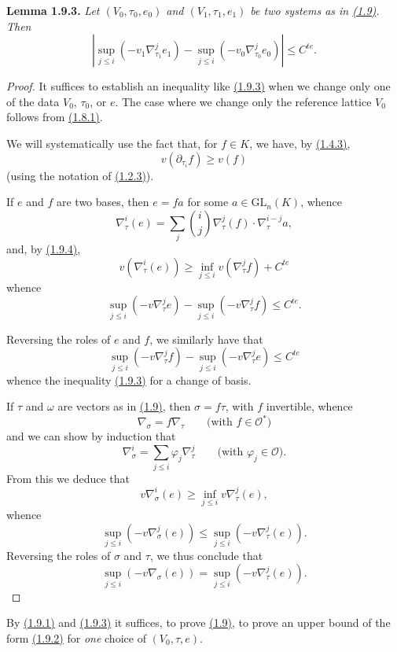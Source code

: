 \documentclass{report}
\newenvironment{itenv}[1]
  {\phantomsection\par\medskip\noindent\textbf{#1.}\itshape}
  {\medskip}
\renewcommand{\cal}[1]{{\mathcal{#1}}}
\newcommand{\GL}{\mathrm{GL}}
\renewcommand{\geq}{\geqslant}
\renewcommand{\leq}{\leqslant}
\newcommand{\oldpage}[1]{\marginpar{\footnotesize$\Big\vert$ \textit{p.~#1}}}
\begin{document}
\begin{itenv}{Lemma 1.9.3}
\label{II.1.9.3}
  Let $(V_0,\tau_0,e_0)$ and $(V_1,\tau_1,e_1)$ be two systems as in \hyperref[II.1.9]{(1.9)}.
  Then
  \[
    |\sup_{j\leq i}(-v_1\nabla_{\tau_1}^j e_1) - \sup_{j\leq i}(-v_0\nabla_{\tau_0}^j e_0)| \leq C^{te}.
  \]
\end{itenv}

\begin{proof}
  It suffices to establish an inequality like \hyperref[II.1.9.3]{(1.9.3)} when we change only one of the data $V_0$, $\tau_0$, or $e$.
  The case where we change only the reference lattice $V_0$ follows from \hyperref[II.1.8.1]{(1.8.1)}.

  We will systematically use the fact that, for $f\in K$, we have, by \hyperref[II.1.4.3]{(1.4.3)},
  \[
  \label{II.1.9.4}
    v(\partial_{\tau_i}f) \geq v(f)
  \tag{1.9.4}
  \]
  (using the notation of \hyperref[II.1.2.3]{(1.2.3)}).

  If $e$ and $f$ are two bases, then $e=fa$ for some $a\in\GL_n(K)$, whence
  \[
    \nabla_\tau^i(e) = \sum_j\binom{i}{j}\nabla_\tau^j(f)\cdot\nabla_\tau^{i-j}a,
  \]
  and, by \hyperref[II.1.9.4]{(1.9.4)},
  \[
    v(\nabla_\tau^i(e)) \geq \inf_{j\leq i}v(\nabla_\tau^j f) + C^{te}
  \]
  whence
  \[
    \sup_{j\leq i}(-v\nabla_\tau^j e) - \sup_{j\leq i}(-v\nabla_\tau^j f) \leq C^{te}.
  \]

  Reversing the roles of $e$ and $f$, we similarly have that
  \[
    \sup_{j\leq i}(-v\nabla_\tau^j f) - \sup_{j\leq i}(-v\nabla_\tau^j e) \leq C^{te}
  \]
  whence the inequality \hyperref[II.1.9.3]{(1.9.3)} for a change of basis.

\oldpage{47}
  If $\tau$ and $\omega$ are vectors as in \hyperref[II.1.9]{(1.9)}, then $\sigma=f\tau$, with $f$ invertible, whence
  \[
    \nabla_\sigma = f\nabla_\tau
    \qquad\mbox{(with $f\in\cal{O}^*$)}
  \]
  and we can show by induction that
  \[
    \nabla_\sigma^i = \sum_{j\leq i}\varphi_j\nabla_\tau^j
    \qquad\mbox{(with $\varphi_j\in\cal{O}$)}.
  \]
  From this we deduce that
  \[
    v\nabla_\sigma^i(e) \geq \inf_{j\leq i}v\nabla_\tau^j(e),
  \]
  whence
  \[
    \sup_{j\leq i}(-v\nabla_\sigma^j(e)) \leq \sup_{j\leq i}(-v\nabla_\tau^j(e)).
  \]
  Reversing the roles of $\sigma$ and $\tau$, we thus conclude that
  \[
  \label{II.1.9.5}
    \sup_{j\leq i}(-v\nabla_\sigma(e)) = \sup_{j\leq i}(-v\nabla_\tau^j(e)).
  \tag{1.9.5}
  \]
\end{proof}

By \hyperref[II.1.9.1]{(1.9.1)} and \hyperref[II.1.9.3]{(1.9.3)} it suffices, to prove \hyperref[II.1.9]{(1.9)}, to prove an upper bound of the form \hyperref[II.1.9.2]{(1.9.2)} for \emph{one} choice of $(V_0,\tau,e)$.
\end{document}
